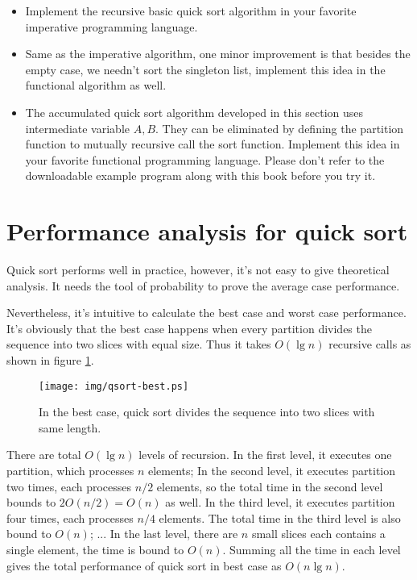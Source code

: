 \documentclass[UTF8]{article}
\begin{document}
\begin{Exercise}
\begin{itemize}
\item Implement the recursive basic quick sort algorithm in your favorite imperative programming language.
\item Same as the imperative algorithm, one minor improvement is that besides the empty case, we needn't sort the singleton list, implement
this idea in the functional algorithm as well.
\item The accumulated quick sort algorithm developed in this section uses intermediate variable $A, B$. They
can be eliminated by defining the partition function to mutually recursive call the sort function. Implement this
idea in your favorite functional programming language. Please don't refer to the downloadable example program
along with this book before you try it.
\end{itemize}
\end{Exercise}

\section{Performance analysis for quick sort}

Quick sort performs well in practice, however, it's not easy to give theoretical analysis. It needs the tool
of probability to prove the average case performance.

Nevertheless, it's intuitive to calculate the best case and worst case performance. It's obviously that
the best case happens when every partition divides the sequence into two slices with equal size. Thus
it takes $O(\lg n)$ recursive calls as shown in figure \ref{fig:qsort-best}.

\begin{figure}[htbp]
 \centering
 \texttt{[image: img/qsort-best.ps]}
 \caption{In the best case, quick sort divides the sequence into two slices with same length.}
 \label{fig:qsort-best}
\end{figure}

There are total $O(\lg n)$ levels of recursion. In the first level, it executes one partition, which
 processes $n$ elements; In the second level, it executes partition two times, each processes $n/2$
elements, so the total time in the second level bounds to $2 O(n/2) = O(n)$ as well. In the third
level, it executes partition four times, each processes $n/4$ elements. The total time in the third
level is also bound to $O(n)$; ... In the last level, there are $n$ small slices each contains a
single element, the time is bound to $O(n)$. Summing all the time in each level gives the total
performance of quick sort in best case as $O(n \lg n)$.
\end{document}
